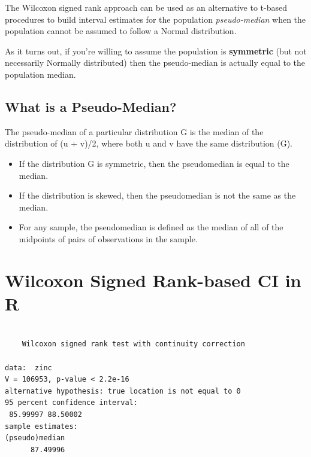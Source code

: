 \documentclass[
]{book}
\newenvironment{Shaded}{\begin{snugshade}}{\end{snugshade}}
\newcommand{\DataTypeTok}[1]{\textcolor[rgb]{0.13,0.29,0.53}{#1}}
\newcommand{\FloatTok}[1]{\textcolor[rgb]{0.00,0.00,0.81}{#1}}
\newcommand{\KeywordTok}[1]{\textcolor[rgb]{0.13,0.29,0.53}{\textbf{#1}}}
\newcommand{\NormalTok}[1]{#1}
\newcommand{\OperatorTok}[1]{\textcolor[rgb]{0.81,0.36,0.00}{\textbf{#1}}}
\newcommand{\OtherTok}[1]{\textcolor[rgb]{0.56,0.35,0.01}{#1}}
\newcommand{\StringTok}[1]{\textcolor[rgb]{0.31,0.60,0.02}{#1}}
\providecommand{\tightlist}{%
  \setlength{\itemsep}{0pt}\setlength{\parskip}{0pt}}
\begin{document}
The Wilcoxon signed rank approach can be used as an alternative to t-based procedures to build interval estimates for the population \emph{pseudo-median} when the population cannot be assumed to follow a Normal distribution.

As it turns out, if you're willing to assume the population is \textbf{symmetric} (but not necessarily Normally distributed) then the pseudo-median is actually equal to the population median.

\hypertarget{what-is-a-pseudo-median}{%
\subsection{What is a Pseudo-Median?}\label{what-is-a-pseudo-median}}

The pseudo-median of a particular distribution G is the median of the distribution of (u + v)/2, where both u and v have the same distribution (G).

\begin{itemize}
\tightlist
\item
  If the distribution G is symmetric, then the pseudomedian is equal to the median.
\item
  If the distribution is skewed, then the pseudomedian is not the same as the median.
\item
  For any sample, the pseudomedian is defined as the median of all of the midpoints of pairs of observations in the sample.
\end{itemize}

\hypertarget{wilcoxon-signed-rank-based-ci-in-r}{%
\section{Wilcoxon Signed Rank-based CI in R}\label{wilcoxon-signed-rank-based-ci-in-r}}

\begin{Shaded}
\end{Shaded}

\begin{verbatim}

	Wilcoxon signed rank test with continuity correction

data:  zinc
V = 106953, p-value < 2.2e-16
alternative hypothesis: true location is not equal to 0
95 percent confidence interval:
 85.99997 88.50002
sample estimates:
(pseudo)median 
      87.49996 
\end{verbatim}
\end{document}
